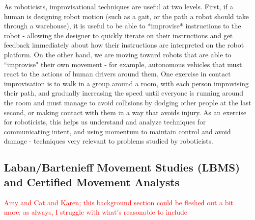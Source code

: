 \documentclass[arts,article,submit,moreauthors,pdftex,10pt,a4paper]{mdpi}
\begin{document}
As
roboticists, improvisational techniques are useful at two levels. First, if a
human is designing robot motion (such as a gait, or the path a robot should
take through a warehouse), it is useful to be able to *improvise* instructions to
the robot - allowing the designer to quickly iterate on their instructions and get
feedback immediately about how their instructions are interpreted on the robot
platform. On the other hand, we are moving toward robots that are able to
``improvise" their own movement - for example, autonomous vehicles that must react to
the actions of human drivers around them. One exercise in contact improvisation
is to walk in a group around a room, with each person improvising their path,
and gradually increasing the speed until everyone is running around the room and
must manage to avoid collisions by dodging other people at the last second, or
making contact with them in a way that avoids injury. As an exercise for
roboticists, this helps us understand and analyze techniques for communicating
intent, and using momentum to maintain control and avoid damage - techniques very
relevant to problems studied by roboticists.


\subsection{Laban/Bartenieff Movement Studies (LBMS) and Certified Movement Analysts}

\textcolor{red}{Amy and Cat and Karen; this background section could be fleshed out a bit more; as always, I struggle with what's reasonable to include}
\end{document}
